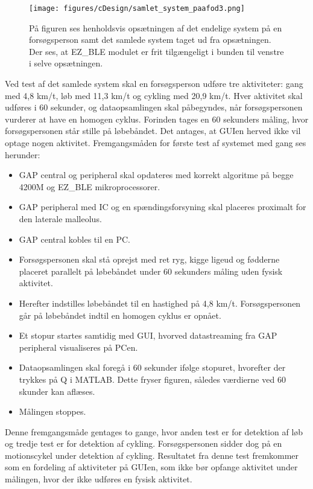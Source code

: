 \begin{figure}[H]
	\centering
	\texttt{[image: figures/cDesign/samlet\_system\_paafod3.png]}
	\caption{På figuren ses henholdsvis opsætningen af det endelige system på en forsøgsperson samt det samlede system taget ud fra opsætningen. Der ses, at EZ\_BLE modulet er frit tilgængeligt i bunden til venstre i selve opsætningen.}
	\label{fig:samlede_system_opstilling}
\end{figure}
Ved test af det samlede system skal en forsøgsperson udføre tre aktiviteter: gang med 4,8 km/t, løb med 11,3 km/t og cykling med 20,9 km/t. Hver aktivitet skal udføres i 60 sekunder, og dataopsamlingen skal påbegyndes, når forsøgspersonen vurderer at have en homogen cyklus. Forinden tages en 60 sekunders måling, hvor forsøgspersonen står stille på løbebåndet. Det antages, at GUIen herved ikke vil optage nogen aktivitet. Fremgangsmåden for første test af systemet med gang ses herunder: 
\begin{itemize}
	\item GAP central og peripheral skal opdateres med korrekt algoritme på begge 4200M og EZ\_BLE mikroprocessorer.
	\item GAP peripheral med IC og en spændingsforsyning skal placeres proximalt for den laterale malleolus.
	\item GAP central kobles til en PC. 
	\item Forsøgspersonen skal stå oprejst med ret ryg, kigge ligeud og fødderne placeret parallelt på løbebåndet under 60 sekunders måling uden fysisk aktivitet.
	\item Herefter indstilles løbebåndet til en hastighed på 4,8 km/t. Forsøgspersonen går på løbebåndet indtil en homogen cyklus er opnået.  
	\item Et stopur startes samtidig med GUI, hvorved datastreaming fra GAP peripheral visualiseres på PCen.
	\item Dataopsamlingen skal foregå i 60 sekunder ifølge stopuret, hvorefter der trykkes på Q i MATLAB. Dette fryser figuren, således værdierne ved 60 skunder kan aflæses.
	\item Målingen stoppes.
\end{itemize}
Denne fremgangsmåde gentages to gange, hvor anden test er for detektion af løb og tredje test er for detektion af cykling. Forsøgspersonen sidder dog på en motionscykel under detektion af cykling. Resultatet fra denne test fremkommer som en fordeling af aktiviteter på GUIen, som ikke bør opfange aktivitet under målingen, hvor der ikke udføres en fysisk aktivitet. \\

